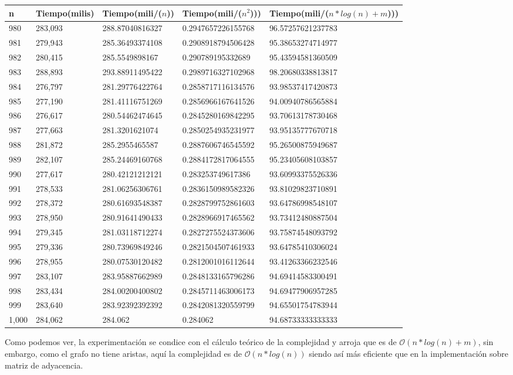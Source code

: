 \begin{table}[H]
\parbox{0.3\textwidth}{
    \begin{tabular}{ | l | l | l | l | l |}
    \hline
n   &Tiempo(milis) &Tiempo(mili/($n$)) &Tiempo(mili/($n^2$))) &Tiempo(mili/($n*log(n) + m$)))\\ \hline
980	&283,093	&288.87040816327	&0.2947657226155768	&96.57257621237783\\ \hline
981	&279,943	&285.36493374108	&0.2908918794506428	&95.38653274714977\\ \hline
982	&280,415	&285.5549898167	    &0.290789195332689	&95.43594581360509\\ \hline
983	&288,893	&293.88911495422	&0.2989716327102968	&98.20680338813817\\ \hline
984	&276,797	&281.29776422764	&0.2858717116134576	&93.98537417420873\\ \hline
985	&277,190	&281.41116751269	&0.2856966167641526	&94.00940786565884\\ \hline
986	&276,617	&280.54462474645	&0.2845280169842295	&93.70613178730468\\ \hline
987	&277,663	&281.3201621074	    &0.2850254935231977	&93.95135777670718\\ \hline
988	&281,872	&285.2955465587	    &0.2887606746545592	&95.26500875949687\\ \hline
989	&282,107	&285.24469160768	&0.2884172817064555	&95.23405608103857\\ \hline
990	&277,617	&280.42121212121	&0.283253749617386	&93.60993375526336\\ \hline
991	&278,533	&281.06256306761	&0.2836150989582326	&93.81029823710891\\ \hline
992	&278,372	&280.61693548387	&0.2828799752861603	&93.64786998548107\\ \hline
993	&278,950	&280.91641490433	&0.2828966917465562	&93.73412480887504\\ \hline
994	&279,345	&281.03118712274	&0.2827275524373606	&93.75874548093792\\ \hline
995	&279,336	&280.73969849246	&0.2821504507461933	&93.64785410306024\\ \hline
996	&278,955	&280.07530120482	&0.2812001016112644	&93.41263366232546\\ \hline
997	&283,107	&283.95887662989	&0.2848133165796286	&94.69414583300491\\ \hline
998	&283,434	&284.00200400802	&0.2845711463006173	&94.69477906957285\\ \hline
999	&283,640	&283.92392392392	&0.2842081320559799	&94.65501754783944\\ \hline
1,000	&284,062	&284.062	&0.284062	&94.68733333333333\\ \hline
    \end{tabular}
}
\end{table}

Como podemos ver, la experimentación se condice con el cálculo teórico de la complejidad y arroja que es de $\mathcal{O}(n*log(n) + m)$, sin embargo, como el grafo no tiene aristas, aquí la complejidad es de $\mathcal{O}(n*log(n))$ siendo así más eficiente que en la implementación sobre matriz de adyacencia.
